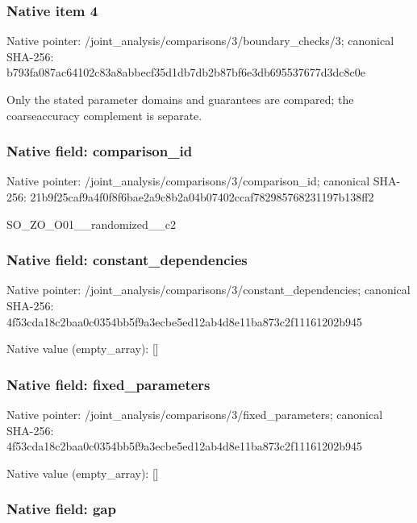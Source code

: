 \documentclass[10pt,a4paper]{article}
\begin{document}
\subsubsection{Native item 4}


Native pointer: /joint\_analysis/comparis\allowbreak{}ons/3/boundary\_checks/3; canonical SHA-256: b793fa087ac64102c83a8abb\allowbreak{}ecf35d1db7db2b87bf6e3db6\allowbreak{}95537677d3dc8c0e


Only the stated parameter domains and guarantees are compared; the coarseaccuracy complement is separate.


\subsubsection{Native field: comparison\_id}


Native pointer: /joint\_analysis/comparis\allowbreak{}ons/3/comparison\_id; canonical SHA-256: 21b9f25caf9a4f0f8f6bae2a\allowbreak{}9c8b2a04b07402ccaf782985\allowbreak{}768231197b138ff2


SO\_ZO\_O01\_\_randomized\_\_c2


\subsubsection{Native field: constant\_dependencies}


Native pointer: /joint\_analysis/comparis\allowbreak{}ons/3/constant\_dependenc\allowbreak{}ies; canonical SHA-256: 4f53cda18c2baa0c0354bb5f\allowbreak{}9a3ecbe5ed12ab4d8e11ba87\allowbreak{}3c2f11161202b945



Native value (empty\_array): []



\subsubsection{Native field: fixed\_parameters}


Native pointer: /joint\_analysis/comparis\allowbreak{}ons/3/fixed\_parameters; canonical SHA-256: 4f53cda18c2baa0c0354bb5f\allowbreak{}9a3ecbe5ed12ab4d8e11ba87\allowbreak{}3c2f11161202b945



Native value (empty\_array): []



\subsubsection{Native field: gap}
\end{document}

